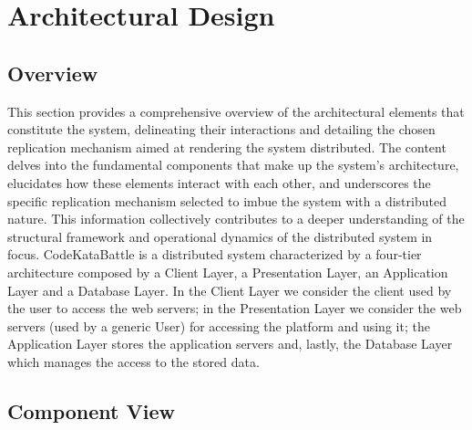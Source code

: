 \documentclass[12pt,oneside,a4paper]{article}
\begin{document}
\clearpage

\section{Architectural Design}

\subsection{Overview}
This section provides a comprehensive overview of the architectural elements that constitute the system, delineating their interactions and detailing the chosen replication mechanism aimed at rendering the system distributed. The content delves into the fundamental components that make up the system's architecture, elucidates how these elements interact with each other, and underscores the specific replication mechanism selected to imbue the system with a distributed nature. This information collectively contributes to a deeper understanding of the structural framework and operational dynamics of the distributed system in focus.
CodeKataBattle is a distributed system characterized by a four-tier architecture composed by a Client Layer, a Presentation Layer, an Application Layer and a Database Layer. In the Client Layer we consider the client used by the user to access the web servers; in the Presentation Layer we consider the web servers (used by a generic User) for accessing the platform and using it; the Application Layer stores the application servers and, lastly, the Database Layer which manages the access to the stored data. 

\pagebreak


\subsection{Component View}
\end{document}
